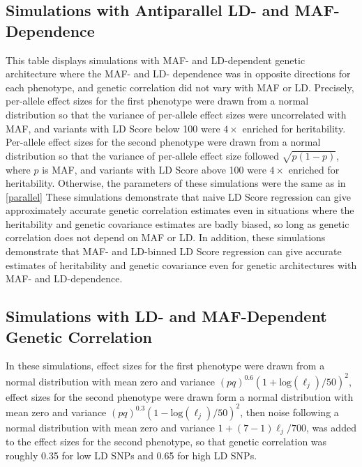 \documentclass[11pt]{article}
\numberwithin{equation}{section}
\numberwithin{definition}{section}
\numberwithin{thm}{section}
\numberwithin{lemma}{section}
\numberwithin{prop}{section}
\numberwithin{cor}{section}
\numberwithin{hyp}{section}
\begin{document}
\newpage
\subsection{Simulations with Antiparallel LD- and MAF-Dependence}
\label{antiparallel}

This table displays simulations with MAF- and LD-dependent genetic architecture where the MAF- and LD- dependence was in opposite directions for each phenotype, and genetic correlation did not vary with MAF or LD. Precisely, per-allele effect sizes for the first phenotype were drawn from a normal distribution so that the variance of per-allele effect sizes were uncorrelated with MAF, and variants with LD Score below 100 were $4\times$ enriched for heritability. Per-allele effect sizes for the second phenotype were drawn from a normal distribution so that the variance of per-allele effect size followed $\sqrt{p(1-p)}$, where $p$ is MAF, and variants with LD Score above 100 were $4\times$ enriched for heritability. Otherwise, the parameters of these simulations were the same as in \ref{parallel}
These simulations demonstrate that naive LD Score regression can give approximately accurate genetic correlation estimates even in situations where the heritability and genetic covariance estimates are badly biased, so long as genetic correlation does not depend on MAF or LD. In addition, these simulations demonstrate that MAF- and LD-binned LD Score regression can give accurate estimates of heritability and genetic covariance even for genetic architectures with MAF- and LD-dependence.
\newpage
\subsection{Simulations with LD- and MAF-Dependent Genetic Correlation}
\label{depcor}


In these simulations, effect sizes for the first phenotype were drawn from a normal distribution with mean zero and variance
$(pq)^{0.6}(1+\mathrm{log}(\ell_j)/50)^2$, 
effect sizes for the second phenotype were drawn form a normal distribution with mean zero and variance
$(pq)^{0.3}(1-\mathrm{log}(\ell_j)/50)^2$,
then noise following a normal distribution with mean zero and variance 
$ 1+(7-1)\ell_j/700$,
was added to the effect sizes for the second phenotype, so that genetic correlation was roughly 0.35 for low LD SNPs and 
0.65 for high LD SNPs.   

%


\newpage
\end{document}

